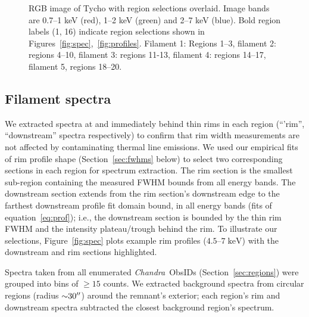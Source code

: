 \documentclass[iop, apj, numberedappendix]{emulateapj}
\newcommand*{\mt}{\mathrm}
\newcommand*{\unit}[1]{\;\mt{#1}}  %
\newcommand*{\abt}{\mathord{\sim}} %
\newcommand*{\Chandra}{\textit{Chandra}\ }
\begin{document}
\begin{figure}
    \centering
    \iftoggle{manuscript}{
    }{
        \plotone{figures/snr.pdf}
    }
    \caption{RGB image of Tycho with region selections overlaid.  Image bands
    are 0.7--1 keV (red), 1--2 keV (green) and 2--7 keV (blue).  Bold region
    labels (1, 16) indicate region selections shown in
    Figures~\ref{fig:spec},~\ref{fig:profiles}.  Filament 1: Regions 1--3,
    filament 2: regions 4--10, filament 3: regions 11-13, filament 4:
    regions 14--17, filament 5, regions 18--20.
    \label{fig:snr}}
\end{figure}

\subsection{Filament spectra}
\label{sec:spec}

We extracted spectra at and immediately behind thin rims in each region
(``'rim'', ``downstream'' spectra respectively) to confirm that rim width
measurements are not affected by contaminating thermal line emissions.  We
used our empirical fits of rim profile shape (Section~\ref{sec:fwhms} below)
to select two corresponding sections in each region for spectrum extraction.
The rim section is the smallest sub-region containing the measured FWHM bounds
from all energy bands.  The downstream section extends from the rim section's
downstream edge to the farthest downstream profile fit domain bound, in all
energy bands (fits of equation~\eqref{eq:prof}); i.e., the downstream section
is bounded by the thin rim FWHM and the intensity plateau/trough behind the
rim.  To illustrate our selections, Figure~\ref{fig:spec} plots example rim
profiles ($4.5$--$7 \unit{keV}$) with the downstream and rim sections
highlighted.

Spectra taken from all enumerated \Chandra ObsIDs (Section~\ref{sec:regions})
were grouped into bins of $\geq 15$ counts.  We extracted background spectra
from circular regions (radius $\abt 30\arcsec$) around the remnant's exterior;
each region's rim and downstream spectra subtracted the closest background
region's spectrum.
\end{document}
